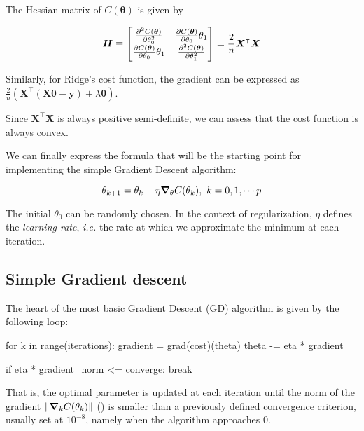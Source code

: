 \documentclass[11pt,a4paper,twocolumn]{article}
\let\oldtexttt\texttt
\renewcommand{\texttt}[1]{\tcbox{\oldtexttt{#1}}}
\begin{document}
The Hessian matrix of $C(\boldsymbol{\theta})$ is given by 

\begin{equation}
\boldsymbol{H} \equiv \begin{bmatrix}
	\pdv[2]{C(\boldsymbol{\theta})}{\theta_0} & \pdv{C(\boldsymbol{\theta})}{\theta_0}{\theta_1}  \\
	\pdv{C(\boldsymbol{\theta})}{\theta_0}{\theta_1} & \pdv[2]{C(\boldsymbol{\theta})}{\theta_1} \\
\end{bmatrix} = \frac{2}{n}\boldsymbol{X}^\intercal \boldsymbol{X}
\end{equation}

Similarly, for Ridge's cost function, the gradient can be expressed as $\frac{2}{n}(\boldsymbol{X}^\intercal(\boldsymbol{X \theta} - \boldsymbol{y})+\lambda \boldsymbol{\theta})$.

Since $\boldsymbol{X}^\intercal \boldsymbol{X}$ is always positive semi-definite, we can assess that the cost function is always convex.

We can finally express the formula that will be the starting point for implementing the simple Gradient Descent algorithm:

\begin{equation}
	\theta_{k+1} = \theta_k - \eta \grad_\theta C(\theta_k), \ k=0,1,\cdots p
\end{equation}

The initial $\theta_0$ can be randomly chosen. In the context of regularization, $\eta$ defines the \emph{learning rate}, \emph{i.e.} the rate at which we approximate the minimum at each iteration.

\subsection{Simple Gradient descent}
The heart of the most basic Gradient Descent (GD) algorithm is given by the following loop:

\begin{python}
for k in range(iterations):
	gradient = grad(cost)(theta)
	theta -= eta * gradient

	if eta * gradient_norm <= converge:
		break
\end{python}

That is, the optimal parameter \texttt{theta} is updated at each \texttt{k} iteration until the norm of the gradient $\norm{\grad_k C(\theta_k)}$ (\texttt{gradient\_norm}) is smaller than a previously defined convergence criterion, usually set at $10^{-8}$, namely when the algorithm approaches 0.
\end{document}
